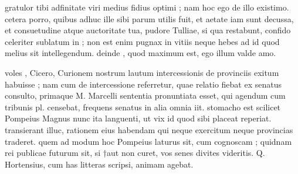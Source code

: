 


 gratulor tibi adfinitate viri medius fidius optimi ; nam hoc ego de illo existimo. cetera porro, quibus adhuc ille sibi parum utilis fuit, et aetate iam sunt decussa, et consuetudine atque auctoritate tua, pudore Tulliae, si qua restabunt, confido celeriter sublatum in ; non est enim pugnax in vitiis neque hebes ad id quod melius sit intellegendum. deinde , quod maximum est, ego illum valde amo.

 voles , Cicero, Curionem nostrum lautum intercessionis de provinciis exitum habuisse ; nam cum de intercessione referretur, quae relatio fiebat ex senatus consulto, primaque M. Marcelli sententia pronuntiata esset, qui agendum cum tribunis pl. censebat, frequens senatus in alia omnia iit. stomacho est scilicet Pompeius Magnus nunc ita languenti, ut vix id quod sibi placeat reperiat. transierant illuc, rationem eius habendam qui neque exercitum neque provincias traderet. quem ad modum hoc Pompeius laturus sit, cum cognoscam ; quidnam rei publicae futurum sit, si †aut non curet, vos senes divites videritis. Q. Hortensius, cum has litteras scripsi, animam agebat.
